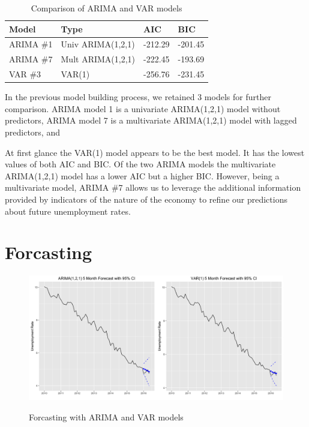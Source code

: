 \documentclass[twoside,twocolumn]{article}
\begin{document}
\begin{table}[H]
\centering
\caption{Comparison of ARIMA and VAR models}
\begin{tabular}{llll}
  \hline
Model & Type & AIC & BIC \\ 
  \hline
ARIMA \#1 &Univ ARIMA(1,2,1) &   -212.29 & -201.45  \\ 
ARIMA \#7 & Mult ARIMA(1,2,1)  & -222.45 & -193.69   \\ 
VAR \#3 & VAR(1) & -256.76 & -231.45 \\ 
   \hline
\end{tabular}
\end{table}


In the previous model building process, we retained 3 models for further comparison. ARIMA model 1 is a univariate ARIMA(1,2,1) model without predictors, ARIMA model 7 is a multivariate ARIMA(1,2,1) model with lagged predictors, and 

At first glance the VAR(1) model appears to be the best model.  It has the lowest values of both AIC and BIC.  Of the two ARIMA models the multivariate ARIMA(1,2,1) model has a lower AIC but a higher BIC. However, being a multivariate model, ARIMA \#7 allows us to leverage the additional information provided by indicators of the nature of the economy to refine our predictions about future unemployment rates.


\section{Forcasting}

 \begin{figure}[htb]
    	\centering
     	\caption{Forcasting with ARIMA and VAR models}
     	\includegraphics[width=\linewidth]{images/forcasts}
     	\label{fig:forcasts}
      \end{figure}
      
\end{document}
